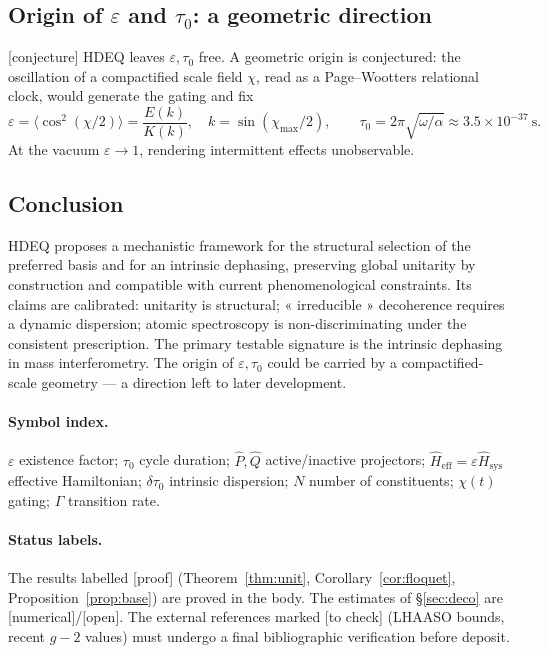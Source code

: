 \documentclass[11pt,a4paper]{article}
\newcommand{\Hsysop}{\hat{H}_{\mathrm{sys}}}
\newcommand{\Heff}{\hat{H}_{\mathrm{eff}}}
\newcommand{\statut}[1]{{\footnotesize\textsf{[#1]}}}
\theoremstyle{plain}
\theoremstyle{definition}
\theoremstyle{remark}
\begin{document}
\subsection{Origin of $\varepsilon$ and $\tau_0$: a geometric direction}
\statut{conjecture} HDEQ leaves $\varepsilon,\tau_0$ free. A geometric origin is
conjectured: the oscillation of a compactified scale field $\chi$, read as a
Page--Wootters relational clock, would generate the gating and fix
\[
\varepsilon=\langle\cos^2(\chi/2)\rangle=\frac{E(k)}{K(k)},\quad
k=\sin(\chi_{\max}/2),\qquad
\tau_0=2\pi\sqrt{\omega/\alpha}\approx3.5\times10^{-37}\ \mathrm{s}.
\]
At the vacuum $\varepsilon\to1$, rendering intermittent effects unobservable.

\subsection{Conclusion}
HDEQ proposes a mechanistic framework for the structural selection of the
preferred basis and for an intrinsic dephasing, preserving global unitarity by
construction and compatible with current phenomenological constraints. Its claims
are calibrated: unitarity is structural; « irreducible » decoherence requires a
dynamic dispersion; atomic spectroscopy is non-discriminating under the consistent
prescription. The primary testable signature is the intrinsic dephasing in mass
interferometry. The origin of $\varepsilon,\tau_0$ could be carried by a
compactified-scale geometry --- a direction left to later development.

\paragraph{Symbol index.}
$\varepsilon$ existence factor; $\tau_0$ cycle duration; $\hat P,\hat Q$
active/inactive projectors; $\Heff=\varepsilon\Hsysop$ effective Hamiltonian;
$\delta\tau_0$ intrinsic dispersion; $N$ number of constituents; $\chi(t)$ gating;
$\Gamma$ transition rate.

\paragraph{Status labels.} The results labelled \statut{proof}
(Theorem~\ref{thm:unit}, Corollary~\ref{cor:floquet}, Proposition~\ref{prop:base})
are proved in the body. The estimates of \S\ref{sec:deco} are
\statut{numerical}/\statut{open}. The external references marked \statut{to check}
(LHAASO bounds, recent $g-2$ values) must undergo a final bibliographic
verification before deposit.
\end{document}
